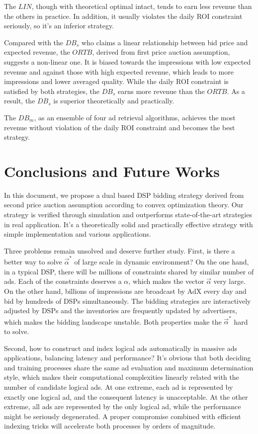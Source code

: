\documentclass[sigconf]{acmart}
\newcommand{\valpha}{\vec{\alpha}}
\begin{document}
The $LIN$, though with theoretical optimal intact, tends to earn less revenue than the others in practice.
In addition, it usually violates the daily ROI constraint seriously, so it's an inferior strategy.

Compared with the $DB_s$ who claims a linear relationship between bid price and expected revenue,
    the $ORTB$, derived from first price auction assumption, suggests a non-linear one.
It is biased towards the impressions with low expected revenue and against those with high expected revenue,
    which leads to more impressions and lower averaged quality.
While the daily ROI constraint is satisfied by both strategies,
    the $DB_s$ earns more revenue than the $ORTB$. As a result, the $DB_s$ is superior theoretically and practically.

The $DB_m$, as an ensemble of four ad retrieval algorithms,
    achieves the most revenue without violation of the daily ROI constraint and becomes the best strategy.

\section{Conclusions and Future Works}

In this document, we propose a dual based DSP bidding strategy
    derived from second price auction assumption according to convex optimization theory.
Our strategy is verified through simulation and outperforms state-of-the-art strategies in real application.
It's a theoretically solid and practically effective strategy with simple implementation and various applications.

Three problems remain unsolved and deserve further study.
First, is there a better way to solve $\valpha^*$ of large scale in dynamic environment?
On the one hand, in a typical DSP, there will be millions of constraints shared by similar number of ads.
Each of the constraints deserves a $\alpha$, which makes the vector $\valpha$ very large.
On the other hand, billions of impressions are broadcast by AdX every day and bid by hundreds of DSPs simultaneously.
The bidding strategies are interactively adjusted by DSPs and the inventories are frequently updated by advertisers,
    which makes the bidding landscape unstable.
Both properties make the $\valpha^*$ hard to solve.

Second, how to construct and index logical ads automatically in massive ads applications, balancing latency and performance?
It's obvious that both deciding and training processes share the same ad evaluation and maximum determination style,
    which makes their computational complexities linearly related with the number of candidate logical ads.
At one extreme, each ad is represented by exactly one logical ad, and the consequent latency is unacceptable.
At the other extreme, all ads are represented by the only logical ad, while the performance might be seriously degenerated.
A proper compromise combined with efficient indexing tricks will accelerate both processes by orders of magnitude.
\end{document}
